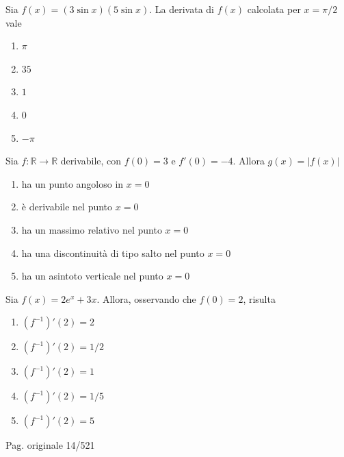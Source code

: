 \begin{quiz}
Sia $f(x)=(3\sin x)(5\sin x)$. La derivata di $f(x)$ calcolata per $x=\pi/2$ vale
\begin{enumerate}[label=\alph*),leftmargin=1.3cm,itemsep=3pt,topsep=5pt]
\item $\pi$
\item $35$
\item $1$
\item $0$
\item $-\pi$
\end{enumerate}
\end{quiz}

\begin{quiz}
Sia $f:\mathbb R\to\mathbb R$ derivabile, con $f(0)=3$ e $f\prime(0)=-4$. Allora $g(x)=|f(x)|$
\begin{enumerate}[label=\alph*),leftmargin=1.3cm,itemsep=3pt,topsep=5pt]
\item ha un punto angoloso in $x=0$
\item \`e derivabile nel punto $x=0$
\item ha un massimo relativo nel punto $x=0$
\item ha una discontinuit\`a di tipo salto nel punto $x=0$
\item ha un asintoto verticale nel punto $x=0$
\end{enumerate}
\end{quiz}

\begin{quiz}
Sia $f(x)=2e^x+3x$. Allora, osservando che $f(0)=2$, risulta
\begin{enumerate}[label=\alph*),leftmargin=1.3cm,itemsep=3pt,topsep=5pt]
\item $(f^{-1})\prime(2)=2$
\item $(f^{-1})\prime(2)=1/2$
\item $(f^{-1})\prime(2)=1$
\item $(f^{-1})\prime(2)=1/5$
\item $(f^{-1})\prime(2)=5$
\end{enumerate}
\end{quiz}

\par\noindent\hfill{\color{cyan!65!black}\scriptsize Pag. originale 14/521}\par\smallskip

